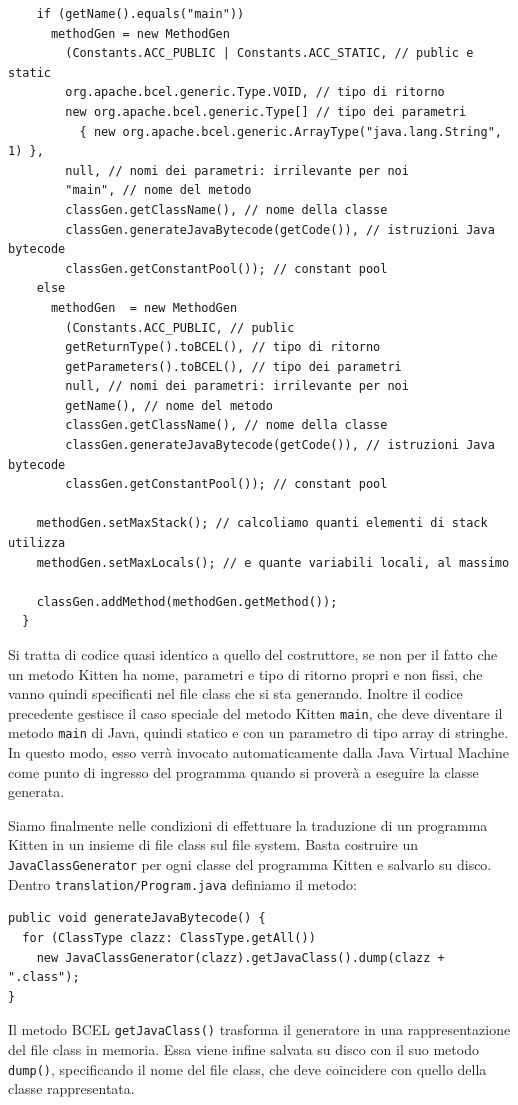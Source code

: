 \begin{itemize}
{\begin{verbatim}
    if (getName().equals("main"))
      methodGen = new MethodGen
        (Constants.ACC_PUBLIC | Constants.ACC_STATIC, // public e static
        org.apache.bcel.generic.Type.VOID, // tipo di ritorno
        new org.apache.bcel.generic.Type[] // tipo dei parametri
          { new org.apache.bcel.generic.ArrayType("java.lang.String", 1) },
        null, // nomi dei parametri: irrilevante per noi
        "main", // nome del metodo
        classGen.getClassName(), // nome della classe
        classGen.generateJavaBytecode(getCode()), // istruzioni Java bytecode
        classGen.getConstantPool()); // constant pool
    else
      methodGen  = new MethodGen
        (Constants.ACC_PUBLIC, // public
        getReturnType().toBCEL(), // tipo di ritorno
        getParameters().toBCEL(), // tipo dei parametri
        null, // nomi dei parametri: irrilevante per noi
        getName(), // nome del metodo
        classGen.getClassName(), // nome della classe
        classGen.generateJavaBytecode(getCode()), // istruzioni Java bytecode
        classGen.getConstantPool()); // constant pool

    methodGen.setMaxStack(); // calcoliamo quanti elementi di stack utilizza
    methodGen.setMaxLocals(); // e quante variabili locali, al massimo

    classGen.addMethod(methodGen.getMethod());
  }
\end{verbatim}}

\noindent
Si tratta di codice quasi identico a quello del costruttore, se non per il fatto che
un metodo Kitten ha nome, parametri e tipo di ritorno propri e non fissi, che vanno
quindi specificati nel file class che si sta generando. Inoltre il codice precedente
gestisce il caso speciale del metodo Kitten \texttt{main}, che deve diventare il
metodo \texttt{main} di Java, quindi statico e con un parametro di tipo array di stringhe.
In questo modo, esso verr\`a invocato automaticamente dalla Java Virtual Machine come
punto di ingresso del programma quando si prover\`a a eseguire la classe generata.
\end{itemize}

Siamo finalmente nelle condizioni di effettuare la traduzione di un programma Kitten
in un insieme di file class sul file system. Basta costruire un \texttt{JavaClassGenerator}
per ogni classe del programma Kitten e salvarlo su disco. Dentro \texttt{translation/Program.java}
definiamo il metodo:
%
\begin{verbatim}
public void generateJavaBytecode() {
  for (ClassType clazz: ClassType.getAll())
    new JavaClassGenerator(clazz).getJavaClass().dump(clazz + ".class");
}
\end{verbatim}
%
Il metodo BCEL \texttt{getJavaClass()} trasforma il generatore in una
rappresentazione del file class in memoria. Essa viene infine salvata su disco
con il suo metodo \texttt{dump()}, specificando il nome del file class,
che deve coincidere con quello della classe rappresentata.
